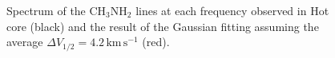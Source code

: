 \begin{figure}[H]
\begin{center}
\label{fig:spec}
\caption{Spectrum of the CH$_3$NH$_2$ lines at each frequency observed in Hot core (black) 
 and the result of the Gaussian fitting assuming the average $\Delta V_{1/2} = 4.2\, \mathrm{km\,s^{-1}}$ (red).}
\end{center}
\end{figure}
